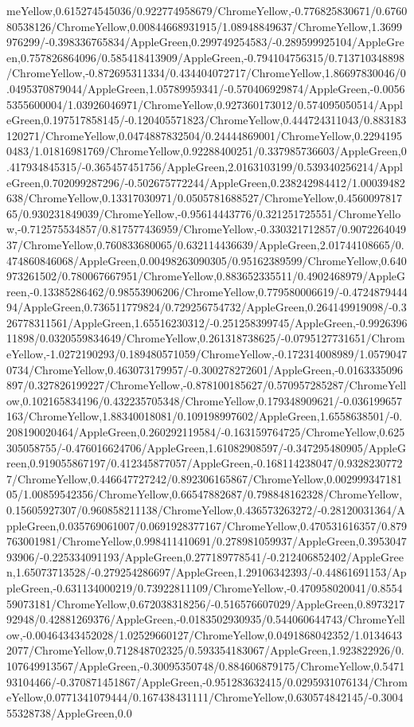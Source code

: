 {\begin{tikzternal}
meYellow,0.615274545036/0.922774958679/ChromeYellow,-0.776825830671/0.676080538126/ChromeYellow,0.00844668931915/1.08948849637/ChromeYellow,1.3699976299/-0.398336765834/AppleGreen,0.299749254583/-0.289599925104/AppleGreen,0.757826864096/0.585418413909/AppleGreen,-0.794104756315/0.713710348898/ChromeYellow,-0.872695311334/0.434404072717/ChromeYellow,1.86697830046/0.0495370879044/AppleGreen,1.05789959341/-0.570406929874/AppleGreen,-0.00565355600004/1.03926046971/ChromeYellow,0.927360173012/0.574095050514/AppleGreen,0.197517858145/-0.120405571823/ChromeYellow,0.444724311043/0.883183120271/ChromeYellow,0.0474887832504/0.24444869001/ChromeYellow,0.22941950483/1.01816981769/ChromeYellow,0.92288400251/0.337985736603/AppleGreen,0.417934845315/-0.365457451756/AppleGreen,2.0163103199/0.539340256214/AppleGreen,0.702099287296/-0.502675772244/AppleGreen,0.238242984412/1.00039482638/ChromeYellow,0.13317030971/0.0505781688527/ChromeYellow,0.456009781765/0.930231849039/ChromeYellow,-0.95614443776/0.321251725551/ChromeYellow,-0.712575534857/0.817577436959/ChromeYellow,-0.330321712857/0.907226404937/ChromeYellow,0.760833680065/0.632114436639/AppleGreen,2.01744108665/0.474860846068/AppleGreen,0.00498263090305/0.95162389599/ChromeYellow,0.640973261502/0.780067667951/ChromeYellow,0.883652335511/0.4902468979/AppleGreen,-0.13385286462/0.98553906206/ChromeYellow,0.779580006619/-0.472487944494/AppleGreen,0.736511779824/0.729256754732/AppleGreen,0.264149919098/-0.326778311561/AppleGreen,1.65516230312/-0.251258399745/AppleGreen,-0.992639611898/0.0320559834649/ChromeYellow,0.261318738625/-0.0795127731651/ChromeYellow,-1.0272190293/0.189480571059/ChromeYellow,-0.172314008989/1.05790470734/ChromeYellow,0.463073179957/-0.300278272601/AppleGreen,-0.0163335096897/0.327826199227/ChromeYellow,-0.878100185627/0.570957285287/ChromeYellow,0.102165834196/0.432235705348/ChromeYellow,0.179348909621/-0.036199657163/ChromeYellow,1.88340018081/0.109198997602/AppleGreen,1.6558638501/-0.208190020464/AppleGreen,0.260292119584/-0.163159764725/ChromeYellow,0.625305058755/-0.476016624706/AppleGreen,1.61082908597/-0.347295480905/AppleGreen,0.919055867197/0.412345877057/AppleGreen,-0.168114238047/0.93282307727/ChromeYellow,0.446647727242/0.892306165867/ChromeYellow,0.00299934718105/1.00859542356/ChromeYellow,0.66547882687/0.798848162328/ChromeYellow,0.15605927307/0.960858211138/ChromeYellow,0.436573263272/-0.28120031364/AppleGreen,0.035769061007/0.0691928377167/ChromeYellow,0.470531616357/0.879763001981/ChromeYellow,0.998411410691/0.278981059937/AppleGreen,0.395304793906/-0.225334091193/AppleGreen,0.277189778541/-0.212406852402/AppleGreen,1.65073713528/-0.279254286697/AppleGreen,1.29106342393/-0.44861691153/AppleGreen,-0.631134000219/0.73922811109/ChromeYellow,-0.470958020041/0.855459073181/ChromeYellow,0.672038318256/-0.516576607029/AppleGreen,0.897321792948/0.42881269376/AppleGreen,-0.0183502930935/0.544060644743/ChromeYellow,-0.00464343452028/1.02529660127/ChromeYellow,0.0491868042352/1.01346432077/ChromeYellow,0.712848702325/0.593354183067/AppleGreen,1.923822926/0.107649913567/AppleGreen,-0.30095350748/0.884606879175/ChromeYellow,0.547193104466/-0.370871451867/AppleGreen,-0.951283632415/0.0295931076134/ChromeYellow,0.0771341079444/0.167438431111/ChromeYellow,0.630574842145/-0.300455328738/AppleGreen,0.0
\end{tikzternal}}
